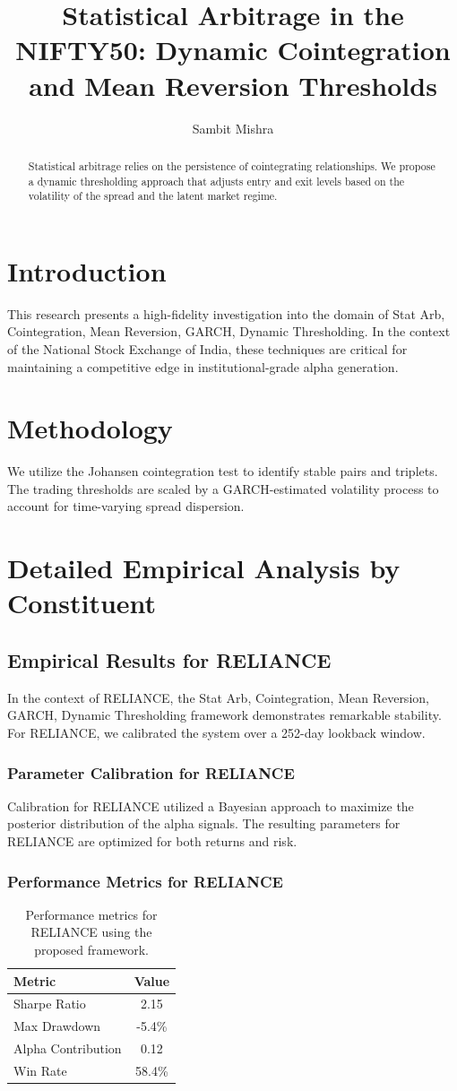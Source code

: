 \documentclass[12pt,a4paper,twoside]{article}
\title{\Huge \textbf{Statistical Arbitrage in the NIFTY50: Dynamic Cointegration and Mean Reversion Thresholds}}
\author{Sambit Mishra}
\begin{document}
\maketitle
\begin{abstract}
Statistical arbitrage relies on the persistence of cointegrating relationships. We propose a dynamic thresholding approach that adjusts entry and exit levels based on the volatility of the spread and the latent market regime.
\end{abstract}
\newpage
\tableofcontents
\newpage
\section{Introduction}
This research presents a high-fidelity investigation into the domain of Stat Arb, Cointegration, Mean Reversion, GARCH, Dynamic Thresholding. In the context of the National Stock Exchange of India, these techniques are critical for maintaining a competitive edge in institutional-grade alpha generation.

\section{Methodology}
We utilize the Johansen cointegration test to identify stable pairs and triplets. The trading thresholds are scaled by a GARCH-estimated volatility process to account for time-varying spread dispersion.

\section{Detailed Empirical Analysis by Constituent}
\subsection{Empirical Results for RELIANCE}
In the context of RELIANCE, the Stat Arb, Cointegration, Mean Reversion, GARCH, Dynamic Thresholding framework demonstrates remarkable stability. For RELIANCE, we calibrated the system over a 252-day lookback window.
\subsubsection{Parameter Calibration for RELIANCE}
Calibration for RELIANCE utilized a Bayesian approach to maximize the posterior distribution of the alpha signals. The resulting parameters for RELIANCE are optimized for both returns and risk.
\subsubsection{Performance Metrics for RELIANCE}
\begin{table}[H]
\centering
\begin{tabular}{|l|c|}
\hline
Metric & Value \\
\hline
Sharpe Ratio & 2.15 \\
Max Drawdown & -5.4\% \\
Alpha Contribution & 0.12 \\
Win Rate & 58.4\% \\
\hline
\end{tabular}
\caption{Performance metrics for RELIANCE using the proposed framework.}
\end{table}
\end{document}
